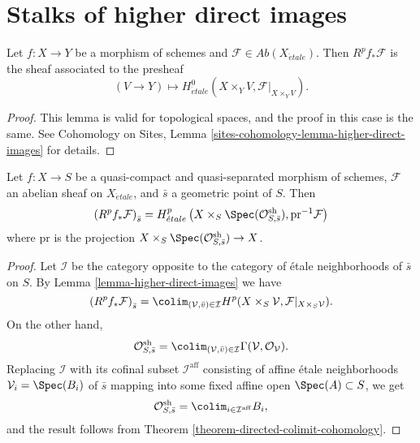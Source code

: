 \section{Stalks of higher direct images}
\label{section-stalks-direct-image}

\begin{lemma}
\label{lemma-higher-direct-images}
Let $f: X\to Y$ be a morphism of schemes and $\mathcal{F}\in
\textit{Ab}(X_{\acute{e}tale})$. Then $R^pf_*\mathcal{F}$ is the sheaf
associated to the presheaf
$$
(V\to Y)\longmapsto H_{\acute{e}tale}^0 \left(X \times_Y V,
\mathcal{F}|_{X \times_Y V}\right).
$$
\end{lemma}

\begin{proof}
This lemma is valid for topological spaces, and the proof in this case is the
same. See
Cohomology on Sites, Lemma
\ref{sites-cohomology-lemma-higher-direct-images}
for details.
\end{proof}

\begin{theorem}
\label{theorem-higher-direct-images}
Let $f: X\to S$ be a quasi-compact and quasi-separated morphism of schemes,
$\mathcal{F}$ an abelian sheaf on $X_{\acute{e}tale}$, and $\bar s$ a
geometric point of $S$. Then
$$
\left(R^pf_* \mathcal{F}\right)_{\bar s} = H_{\acute{e}tale}^p\left( X \times_S
\Spec(\mathcal{O}_{S, \bar s}^\mathrm{sh}),
\text{pr}^{-1}\mathcal{F}\right)
$$
where $\text{pr}$ is the projection $X \times_S \Spec(\mathcal{O}_{S,
\bar{s}}^\mathrm{sh}) \to X$.
\end{theorem}

\begin{proof}
Let $\mathcal{I}$ be the category opposite to the category of \'etale
neighborhoods of $\bar s$ on $S$. By Lemma \ref{lemma-higher-direct-images}
we have
$$
\left(R^pf_*\mathcal{F}\right)_{\bar{s}} = \colim_{(\mathcal{V},
\bar{v})\in \mathcal{I}} H^p(X \times_S\mathcal{V},
\mathcal{F}|_{X \times_S\mathcal{V}}).
$$
On the other hand,
$$
\mathcal{O}_{S, \bar{s}}^\mathrm{sh} = \colim_{(\mathcal{V}, \bar v)\in
\mathcal{I}} \Gamma(\mathcal{V}, \mathcal{O}_\mathcal{V}).
$$
Replacing $\mathcal{I}$ with its cofinal subset $\mathcal{I}^\mathrm{aff}$
consisting of affine \'etale neighborhoods $\mathcal{V}_i= \Spec(B_i)$ of
$\bar s$ mapping into some fixed affine open $\Spec(A) \subset S$, we get
$$
\mathcal{O}_{S, \bar{s}}^\mathrm{sh} = \colim_{i\in
\mathcal{I}^\mathrm{aff}} B_i,
$$
and the result follows from Theorem \ref{theorem-directed-colimit-cohomology}.
\end{proof}






